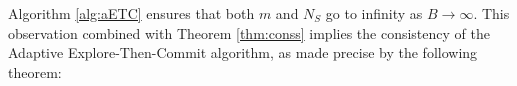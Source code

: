 \documentclass[a4paper,11pt]{article}
\numberwithin{equation}{section}
\theoremstyle{plain}
\theoremstyle{definition}
\def\E{{\mathbb E}}
\def\lrmc{{\textsf{LRMC}}}
\begin{document}


Algorithm \ref{alg:aETC} ensures that both $m$ and $N_S$ go to infinity as $B\to\infty$. This observation combined with Theorem \ref{thm:conss} implies the consistency of the Adaptive Explore-Then-Commit algorithm, as made precise by the following theorem:
\end{document}

